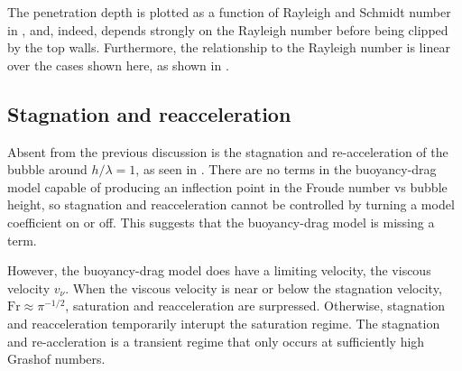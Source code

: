 The penetration depth is plotted as a function of Rayleigh and Schmidt number in , and, indeed, depends strongly on the Rayleigh number before being clipped by the top walls.
Furthermore, the relationship to the Rayleigh number is linear over the cases shown here, as shown in .

\subsection{Stagnation and reacceleration}

Absent from the previous discussion is the stagnation and re-acceleration of the bubble around $h / \lambda = 1$, as seen in .
There are no terms in the buoyancy-drag model capable of producing an inflection point in the Froude number vs bubble height, so stagnation and reacceleration cannot be controlled by turning a model coefficient on or off.
This suggests that the buoyancy-drag model is missing a term.

However, the buoyancy-drag model does have a limiting velocity, the viscous velocity $v_\nu$.
When the viscous velocity is near or below the stagnation velocity, $\text{Fr} \approx \pi^{-1/2}$, saturation and reacceleration are surpressed.
Otherwise, stagnation and reacceleration temporarily interupt the saturation regime.
The stagnation and re-accleration is a transient regime that only occurs at sufficiently high Grashof numbers.

